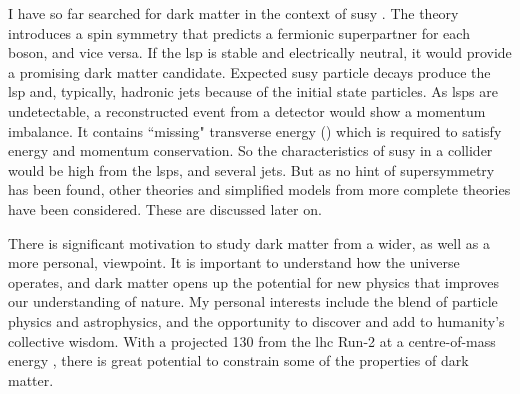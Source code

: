 I have so far searched for dark matter in the context of \acrfull{susy} \cite{Martin:1997ns}. The theory introduces a spin symmetry that predicts a fermionic superpartner for each boson, and vice versa. If the \acrfull{lsp} is stable and electrically neutral, it would provide a promising dark matter candidate. Expected \acrshort{susy} particle decays produce the \acrshort{lsp} and, typically, hadronic jets because of the initial state particles. As \glspl{lsp} are undetectable, a reconstructed event from a detector would show a momentum imbalance. It contains ``missing" transverse energy () which is required to satisfy energy and momentum conservation. So the characteristics of \acrshort{susy} in a collider would be high \etmiss from the \glspl{lsp}, and several jets. But as no hint of supersymmetry has been found, other theories and simplified models from more complete theories have been considered. These are discussed later on.

There is significant motivation to study dark matter from a wider, as well as a more personal, viewpoint. It is important to understand how the universe operates, and dark matter opens up the potential for new physics that improves our understanding of nature. My personal interests include the blend of particle physics and astrophysics, and the opportunity to discover and add to humanity's collective wisdom. With a projected 130 \fbinv from the \acrshort{lhc} Run-2 at a centre-of-mass energy \comruntwo, there is great potential to constrain some of the properties of dark matter.


